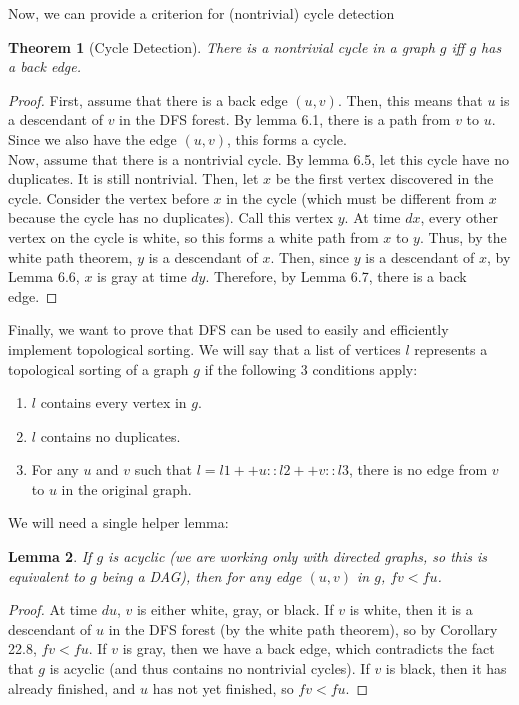 \documentclass{article}
\newtheorem{theorem}{Theorem}[section]
\newtheorem{lemma}[theorem]{Lemma}
\begin{document}
Now, we can provide a criterion for (nontrivial) cycle detection
\begin{theorem}[Cycle Detection]
There is a nontrivial cycle in a graph $g$ iff $g$ has a back edge.
\end{theorem}
\begin{proof}
First, assume that there is a back edge $(u,v)$. Then, this means that $u$ is a descendant of $v$ in the DFS forest. By lemma 6.1, there is a path from $v$ to $u$. Since we also have the edge $(u,v)$, this forms a cycle.
\\Now, assume that there is a nontrivial cycle. By lemma 6.5, let this cycle have no duplicates. It is still nontrivial. Then, let $x$ be the first vertex discovered in the cycle. Consider the vertex before $x$ in the cycle (which must be different from $x$ because the cycle has no duplicates). Call this vertex $y$. At time $dx$, every other vertex on the cycle is white, so this forms a white path from $x$ to $y$. Thus, by the white path theorem, $y$ is a descendant of $x$. Then, since $y$ is a descendant of $x$, by Lemma 6.6, $x$ is gray at time $dy$. Therefore, by Lemma 6.7, there is a back edge.
\end{proof}
Finally, we want to prove that DFS can be used to easily and efficiently implement topological sorting. We will say that a list of vertices $l$ represents a topological sorting of a graph $g$ if the following 3 conditions apply:
\begin{enumerate}
\item
$l$ contains every vertex in $g$.
\item
$l$ contains no duplicates.
\item
For any $u$ and $v$ such that $l = l1 ++ u :: l2 ++ v :: l3$, there is no edge from $v$ to $u$ in the original graph.
\end{enumerate}
We will need a single helper lemma:
\begin{lemma}
If $g$ is acyclic (we are working only with directed graphs, so this is equivalent to $g$ being a DAG), then for any edge $(u,v)$ in $g$, $fv < fu$. 
\end{lemma}
\begin{proof}
At time $du$, $v$ is either white, gray, or black. If $v$ is white, then it is a descendant of $u$ in the DFS forest (by the white path theorem), so by Corollary 22.8, $fv < fu$. If $v$ is gray, then we have a back edge, which contradicts the fact that $g$ is acyclic (and thus contains no nontrivial cycles). If $v$ is black, then it has already finished, and $u$ has not yet finished, so $fv < fu$.
\end{proof}
\end{document}
